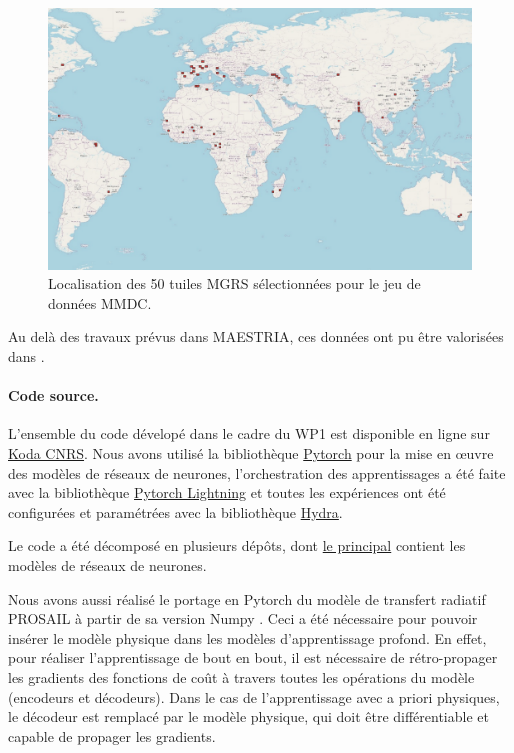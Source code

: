 \begin{figure}[htbp]
\begin{center}
\includegraphics[width=\columnwidth]{img/wp1/tiles.pdf}
\caption{Localisation des 50 tuiles MGRS sélectionnées pour le jeu de données MMDC.}
\label{fig:mmdctiles}
\end{center}
\end{figure}

Au delà des travaux prévus dans MAESTRIA, ces données ont pu être valorisées dans \citep{dumeur-2023-self-satel}.

\paragraph{Code source.}
L’ensemble du code dévelopé dans le cadre du WP1 est disponible en ligne sur \href{https://src.koda.cnrs.fr/mmdc}{Koda CNRS}. Nous avons utilisé la bibliothèque \href{https://pytorch.org/}{Pytorch} pour la mise en œuvre des modèles de réseaux de neurones, l’orchestration des apprentissages a été faite avec la bibliothèque \href{https://lightning.ai/}{Pytorch Lightning} et toutes les expériences ont été configurées et paramétrées avec la bibliothèque \href{https://hydra.cc/}{Hydra}.

Le code a été décomposé en plusieurs dépôts, dont \href{https://src.koda.cnrs.fr/mmdc/mmdc-singledate}{le principal} contient les modèles de réseaux de neurones.

Nous avons aussi réalisé le portage en Pytorch du modèle de transfert radiatif PROSAIL \cite{jacquemoud-2009-prosp-sail-model} à partir de sa version Numpy \cite{domenzain19}. Ceci a été nécessaire pour pouvoir insérer le modèle physique dans les modèles d’apprentissage profond. En effet, pour réaliser l’apprentissage de bout en bout, il est nécessaire de rétro-propager les gradients des fonctions de coût à travers toutes les opérations du modèle (encodeurs et décodeurs). Dans le cas de l’apprentissage avec a priori physiques, le décodeur est remplacé par le modèle physique, qui doit être différentiable et capable de propager les gradients.

